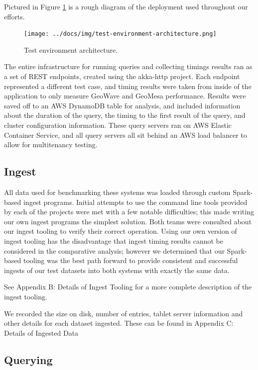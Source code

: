 Pictured in Figure \ref{deployment} is a rough diagram of the deployment used throughout our efforts.

\begin{figure}[h!tb]
  \centering
  \texttt{[image: ../docs/img/test-environment-architecture.png]}
  \caption{Test environment architecture.}
  \label{deployment}
\end{figure}

The entire infrastructure for running queries and collecting timings results ran as a set of REST endpoints, created using the akka-http project.
Each endpoint represented a different test case, and timing results were taken from inside of the application to only measure GeoWave and GeoMesa performance.
Results were saved off to an AWS DynamoDB table for analysis, and included information about the duration of the query, the timing to the first result of the query, and cluster configuration information.
These query servers ran on AWS Elastic Container Service, and all query servers all sit behind an AWS load balancer to allow for multitenancy testing.


\subsection{Ingest}
\label{sec:performance:ingest}

All data used for benchmarking these systems was loaded through custom Spark-based ingest programs.
Initial attempts to use the command line tools provided by each of the projects were met with a few notable difficulties; this made writing our own ingest programs the simplest solution.
Both teams were consulted about our ingest tooling to verify their correct operation.
Using our own version of ingest tooling has the disadvantage that ingest timing results cannot be considered in the comparative analysis; however we determined that our Spark-based tooling was the best path forward to provide consistent and successful ingests of our test datasets into both systems with exactly the same data.

See Appendix B: Details of Ingest Tooling for a more complete description of the ingest tooling.

We recorded the size on disk, number of entries, tablet server information and other details for each dataset ingested.
These can be found in Appendix C: Details of Ingested Data


\subsection{Querying}
\label{sec:performance:querying}

